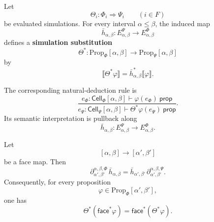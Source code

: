 \begin{definition}
\label{def:cmett-simulation-substitution}
    Let
    \[
        \Theta_i:\Phi_i\Rightarrow\Psi_i
        \qquad (i\in F)
    \]
    be evaluated simulations. For every interval \(\alpha\leq\beta\),
    the induced map
    \[
        \bar h_{\alpha,\beta}:E_{\alpha,\beta}^{\Psi}
        \to
        E_{\alpha,\beta}^{\Phi}
    \]
    defines a \textbf{simulation substitution}
    \[
        \Theta^*:
        \mathrm{Prop}_{\Phi}[\alpha,\beta]
        \to
        \mathrm{Prop}_{\Psi}[\alpha,\beta]
    \]
    by
    \[
        \llbracket\Theta^*\varphi\rrbracket
        =
        \bar h_{\alpha,\beta}^*
        \llbracket\varphi\rrbracket.
    \]
\end{definition}

The corresponding natural-deduction rule is
\[
\frac{
    e_\Phi:\mathsf{Cell}_{\Phi}[\alpha,\beta]\vdash
    \varphi(e_\Phi)\ \mathsf{prop}
}{
    e_\Psi:\mathsf{Cell}_{\Psi}[\alpha,\beta]\vdash
    \Theta^*\varphi(e_\Psi)\ \mathsf{prop}
}.
\]
Its semantic interpretation is pullback along
\[
    \bar h_{\alpha,\beta}:E_{\alpha,\beta}^{\Psi}
    \to E_{\alpha,\beta}^{\Phi}.
\]

\begin{proposition}
\label{prop:cmett-simulation-substitution-faces}
    Let
    \[
        [\alpha,\beta]\to[\alpha',\beta']
    \]
    be a face map. Then
    \[
        \partial_{\alpha',\beta'}^{\alpha,\beta,\Phi}
        \,
        \bar h_{\alpha,\beta}
        =
        \bar h_{\alpha',\beta'}
        \,
        \partial_{\alpha',\beta'}^{\alpha,\beta,\Psi}.
    \]
    Consequently, for every proposition
    \[
        \varphi\in\mathrm{Prop}_{\Phi}[\alpha',\beta'],
    \]
    one has
    \[
        \Theta^*(\mathsf{face}^*\varphi)
        =
        \mathsf{face}^*(\Theta^*\varphi).
    \]
\end{proposition}

